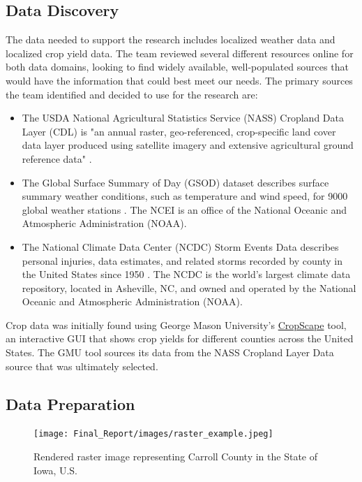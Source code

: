 \documentclass{article}
\begin{document}
\subsection{Data Discovery}
\hspace{.5cm}The data needed to support the research includes localized weather data and localized crop yield data. The team reviewed several different resources online for both data domains, looking to find widely available, well-populated sources that would have the information that could best meet our needs. The primary sources the team identified and decided to use for the research are:
\begin{itemize}
    \item The USDA National Agricultural Statistics Service (NASS) Cropland Data Layer (CDL) is "an annual raster, geo-referenced, crop-specific land cover data layer produced using satellite imagery and extensive agricultural ground reference data" \citep{NASS-CDL}.
    \item The Global Surface Summary of Day (GSOD) dataset describes surface summary weather conditions, such as temperature and wind speed, for 9000 global weather stations \citep{NOAA-NCEI}. The NCEI is an office of the National Oceanic and Atmospheric Administration (NOAA).
    \item The National Climate Data Center (NCDC) Storm Events Data describes personal injuries, data estimates, and related storms recorded by county in the United States since 1950 \citep{NOAA-NCDC}. The NCDC is the world's largest climate data repository, located in Asheville, NC, and owned and operated by the National Oceanic and Atmospheric Administration (NOAA).
\end{itemize}

Crop data was initially found using George Mason University's \href{https://nassgeodata.gmu.edu/CropScape/}{CropScape} tool, an interactive GUI that shows crop yields for different counties across the United States. The GMU tool sources its data from the NASS Cropland Layer Data source that was ultimately selected. 

\subsection{Data Preparation}

\begin{figure}
  \begin{center}
    \label{sec:raster}
    \vspace*{-8mm}
    \texttt{[image: Final\_Report/images/raster\_example.jpeg]}
  \end{center}
  \vspace*{-5mm}
  \caption{Rendered raster image representing Carroll County in the State of Iowa, U.S. \citep{RemoteSens}}
  \vspace*{-2mm}
\end{figure}
\end{document}
